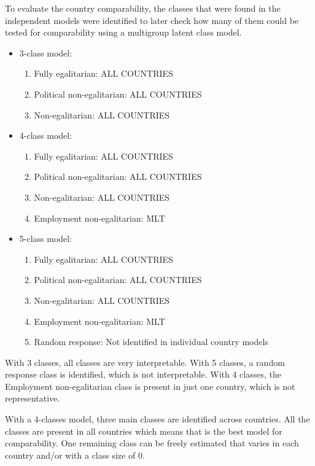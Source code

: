 \documentclass[12pt,a4paper,oneside]{reedthesis}
\providecommand{\tightlist}{%
  \setlength{\itemsep}{0pt}\setlength{\parskip}{0pt}}
\begin{document}
To evaluate the country comparability, the classes that were found in the independent models were identified to later check how many of them could be tested for comparability using a multigroup latent class model.
\begin{itemize}
\tightlist
\item
  3-class model:
  \begin{enumerate}
  \def\labelenumi{\arabic{enumi}.}
  \tightlist
  \item
    Fully egalitarian: ALL COUNTRIES
  \item
    Political non-egalitarian: ALL COUNTRIES
  \item
    Non-egalitarian: ALL COUNTRIES
  \end{enumerate}
\item
  4-class model:
  \begin{enumerate}
  \def\labelenumi{\arabic{enumi}.}
  \tightlist
  \item
    Fully egalitarian: ALL COUNTRIES
  \item
    Political non-egalitarian: ALL COUNTRIES
  \item
    Non-egalitarian: ALL COUNTRIES
  \item
    Employment non-egalitarian: MLT
  \end{enumerate}
\end{itemize}
\newpage
\begin{itemize}
\tightlist
\item
  5-class model:
  \begin{enumerate}
  \def\labelenumi{\arabic{enumi}.}
  \tightlist
  \item
    Fully egalitarian: ALL COUNTRIES
  \item
    Political non-egalitarian: ALL COUNTRIES
  \item
    Non-egalitarian: ALL COUNTRIES
  \item
    Employment non-egalitarian: MLT
  \item
    Random response: Not identified in individual country models
  \end{enumerate}
\end{itemize}
With 3 classes, all classes are very interpretable. With 5 classes, a random response class is identified, which is not interpretable. With 4 classes, the Employment non-egalitarian class is present in just one country, which is not representative.

With a 4-classes model, three main classes are identified across countries. All the classes are present in all countries which means that is the best model for comparability. One remaining class can be freely estimated that varies in each country and/or with a class size of 0.
\end{document}
